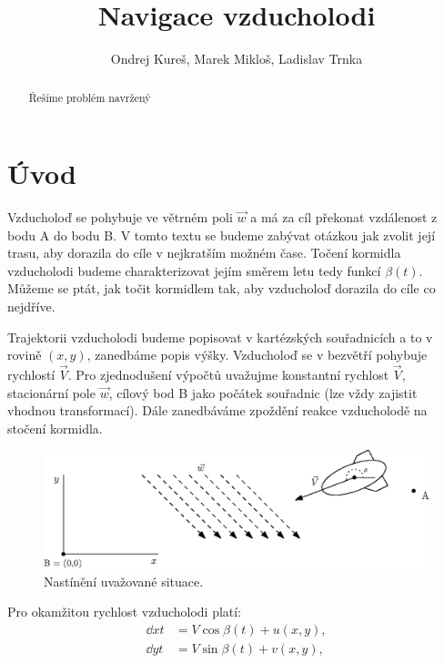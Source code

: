 \documentclass[reqno, a4paper]{amsart}
\title[Matematické kyvadlo]{Navigace vzducholodi}
\author{Ondrej Kureš, Marek Mikloš, Ladislav Trnka}
\numberwithin{equation}{section}
\begin{document}
\begin{abstract}
Řešíme problém navržený \citep{prusa.tuma}
\end{abstract}

\maketitle

\tableofcontents



\section{Úvod}
\label{sec:Úvod}

Vzducholoď se pohybuje ve větrném poli $\vec{w}$ a má za cíl překonat vzdálenost z bodu A do bodu B. V tomto textu se budeme zabývat otázkou jak zvolit její trasu, aby dorazila do cíle v nejkratším možném čase. Točení kormidla vzducholodi budeme charakterizovat jejím směrem letu tedy funkcí $\beta (t)$. Můžeme se ptát, jak točit kormidlem tak, aby vzducholoď dorazila do cíle co nejdříve. 

Trajektorii vzducholodi budeme popisovat v kartézských souřadnicích a to v rovině $(x,y)$, zanedbáme popis výšky. Vzducholoď se v bezvětří pohybuje rychlostí $\vec{V}$. Pro zjednodušení výpočtů uvažujme konstantní rychlost $\vec{V}$, stacionární pole $\vec{w}$, cílový bod B jako počátek souřadnic (lze vždy zajistit vhodnou transformací). Dále zanedbáváme zpoždění reakce vzducholodě na stočení kormidla.

\begin{figure}[h!]
  \centering
  \includegraphics[width=15cm]{figures/airship.eps}
  \caption{Nastínění uvažované situace.}
  \label{Rplot1-2}
\end{figure}

Pro okamžitou rychlost vzducholodi platí:
\begin{equation} 
\label{rce1}
\begin{split}
\dd{x}{t} & = V \cos \beta(t) + u(x,y), \\
\dd{y}{t} & = V \sin \beta(t) + v(x,y),
\end{split}
\end{equation}
\end{document}
